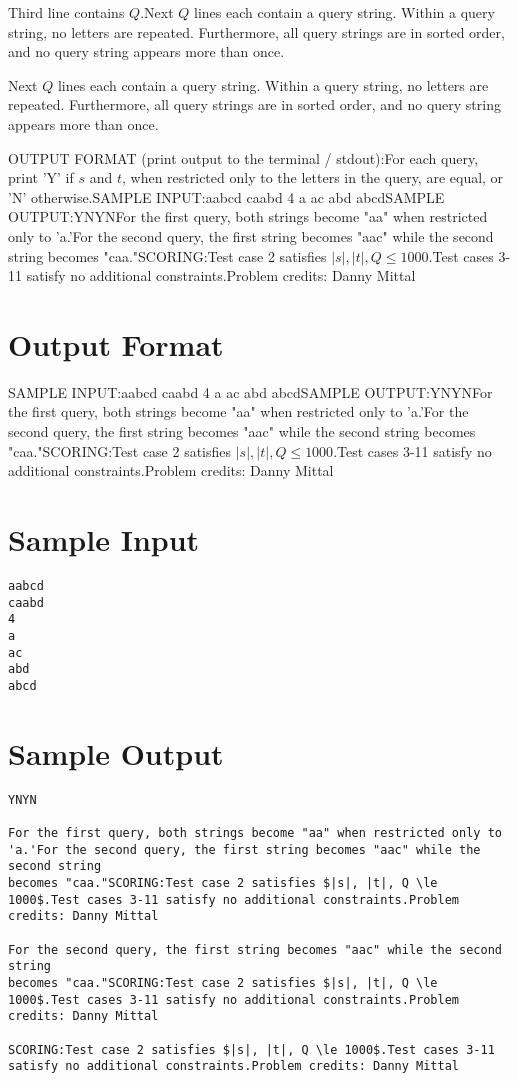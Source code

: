 \documentclass[12pt]{article}
\begin{document}
Third line contains $Q$.Next $Q$ lines each contain a query string. Within a query string, no letters
are repeated. Furthermore, all query strings are in sorted order, and no query
string appears more than once.

Next $Q$ lines each contain a query string. Within a query string, no letters
are repeated. Furthermore, all query strings are in sorted order, and no query
string appears more than once.

OUTPUT FORMAT (print output to the terminal / stdout):For each query, print 'Y' if $s$ and $t$, when restricted only to the letters in
the query, are equal, or 'N' otherwise.SAMPLE INPUT:aabcd
caabd
4
a
ac
abd
abcdSAMPLE OUTPUT:YNYNFor the first query, both strings become "aa" when restricted only to 'a.'For the second query, the first string becomes "aac" while the second string
becomes "caa."SCORING:Test case 2 satisfies $|s|, |t|, Q \le 1000$.Test cases 3-11 satisfy no additional constraints.Problem credits: Danny Mittal

\section*{Output Format}
SAMPLE INPUT:aabcd
caabd
4
a
ac
abd
abcdSAMPLE OUTPUT:YNYNFor the first query, both strings become "aa" when restricted only to 'a.'For the second query, the first string becomes "aac" while the second string
becomes "caa."SCORING:Test case 2 satisfies $|s|, |t|, Q \le 1000$.Test cases 3-11 satisfy no additional constraints.Problem credits: Danny Mittal

\section*{Sample Input}
\begin{verbatim}
aabcd
caabd
4
a
ac
abd
abcd
\end{verbatim}

\section*{Sample Output}
\begin{verbatim}
YNYN

For the first query, both strings become "aa" when restricted only to 'a.'For the second query, the first string becomes "aac" while the second string
becomes "caa."SCORING:Test case 2 satisfies $|s|, |t|, Q \le 1000$.Test cases 3-11 satisfy no additional constraints.Problem credits: Danny Mittal

For the second query, the first string becomes "aac" while the second string
becomes "caa."SCORING:Test case 2 satisfies $|s|, |t|, Q \le 1000$.Test cases 3-11 satisfy no additional constraints.Problem credits: Danny Mittal

SCORING:Test case 2 satisfies $|s|, |t|, Q \le 1000$.Test cases 3-11 satisfy no additional constraints.Problem credits: Danny Mittal
\end{verbatim}
\end{document}
